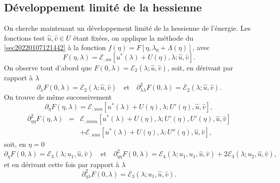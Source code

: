 \documentclass[12pt, final]{amsart}
\begin{document}
\subsection{D{\'e}veloppement limit{\'e} de la
hessienne}\label{sec20211115081016}

On cherche maintenant un d{\'e}veloppement limit{\'e} de la hessienne de
l'{\'e}nergie. Les fonctions test $\hat{u}, \hat{v} \in U$ {\'e}tant
fix{\'e}es, on applique la m{\'e}thode du
{\textsection}\ref{sec20220107121442} {\`a} la fonction $f (\eta) = F [\eta,
\lambda_0 + \Lambda (\eta)]$, avec
\begin{equation}
  F (\eta, \lambda) =\mathcal{E}_{, u  u} [u^{\ast} (\lambda) + U
  (\eta), \lambda ; \hat{u}, \hat{v}] .
\end{equation}
On observe tout d'abord que $F (0, \lambda) =\mathcal{E}_2 (\lambda ; \hat{u},
\hat{v})$, soit, en d{\'e}rivant par rapport {\`a} $\lambda$
\begin{equation}
  \partial_{\lambda} F (0, \lambda) = \dot{\mathcal{E}_2} (\lambda ; \hat{u},
  \hat{v}) \quad \text{et} \quad \partial_{\lambda  \lambda}^2 F (0,
  \lambda) = \ddot{\mathcal{E}_2} (\lambda ; \hat{u}, \hat{v}) .
\end{equation}
On trouve de m{\^e}me successivement
\begin{equation}
  \partial_{\eta} F (\eta, \lambda) =\mathcal{E}_{, u  u  u}
  [u^{\ast} (\lambda) + U (\eta), \lambda ; U' (\eta), \hat{u}, \hat{v}],
\end{equation}
\begin{eqnarray}
  \partial_{\eta  \eta}^2 F (\eta, \lambda) & = & \mathcal{E}_{, u
   u  u  u} [u^{\ast} (\lambda) + U (\eta), \lambda ;
  U' (\eta), U' (\eta), \hat{u}, \hat{v}] \nonumber\\
  &  & +\mathcal{E}_{, u  u  u} [u^{\ast} (\lambda) + U
  (\eta), \lambda ; U'' (\eta), \hat{u}, \hat{v}],
\end{eqnarray}
soit, en $\eta = 0$
\begin{equation}
  \partial_{\eta} F (0, \lambda) =\mathcal{E}_3 (\lambda ; u_1, \hat{u},
  \hat{v}) \quad \text{et} \quad \partial_{\eta  \eta}^2 F (0,
  \lambda) =\mathcal{E}_4 (\lambda ; u_1, u_1, \hat{u}, \hat{v}) +
  2\mathcal{E}_3 (\lambda ; u_2, \hat{u}, \hat{v}),
\end{equation}
et en d{\'e}rivant cette fois par rapport {\`a} $\lambda$
\begin{equation}
  \partial_{\eta  \lambda}^2 F (0, \lambda) = \dot{\mathcal{E}_3}
  (\lambda ; u_1, \hat{u}, \hat{v}) .
\end{equation}
\end{document}
